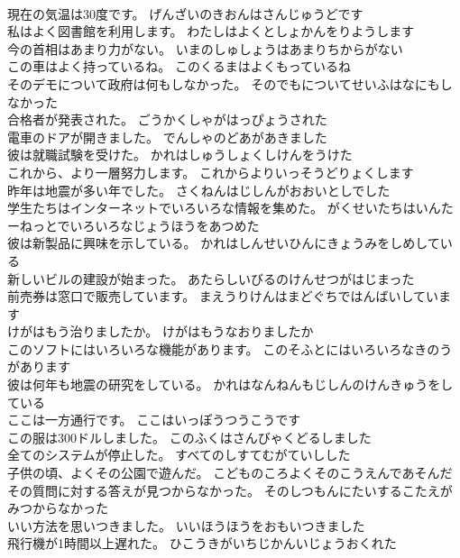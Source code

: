 \documentclass[8pt]{extreport}
\begin{document}
\begin{CJK}{UTF8}{min}
\\	現在の気温は30度です。	げんざいのきおんはさんじゅうどです 
\\	私はよく図書館を利用します。	わたしはよくとしょかんをりようします 
\\	今の首相はあまり力がない。	いまのしゅしょうはあまりちからがない 
\\	この車はよく持っているね。	このくるまはよくもっているね 
\\	そのデモについて政府は何もしなかった。	そのでもについてせいふはなにもしなかった 
\\	合格者が発表された。	ごうかくしゃがはっぴょうされた 
\\	電車のドアが開きました。	でんしゃのどあがあきました 
\\	彼は就職試験を受けた。	かれはしゅうしょくしけんをうけた 
\\	これから、より一層努力します。	これからよりいっそうどりょくします 
\\	昨年は地震が多い年でした。	さくねんはじしんがおおいとしでした 
\\	学生たちはインターネットでいろいろな情報を集めた。	がくせいたちはいんたーねっとでいろいろなじょうほうをあつめた 
\\	彼は新製品に興味を示している。	かれはしんせいひんにきょうみをしめしている 
\\	新しいビルの建設が始まった。	あたらしいびるのけんせつがはじまった 
\\	前売券は窓口で販売しています。	まえうりけんはまどぐちではんばいしています 
\\	けがはもう治りましたか。	けがはもうなおりましたか 
\\	このソフトにはいろいろな機能があります。	このそふとにはいろいろなきのうがあります 
\\	彼は何年も地震の研究をしている。	かれはなんねんもじしんのけんきゅうをしている 
\\	ここは一方通行です。	ここはいっぽうつうこうです 
\\	この服は300ドルしました。	このふくはさんびゃくどるしました 
\\	全てのシステムが停止した。	すべてのしすてむがていしした 
\\	子供の頃、よくその公園で遊んだ。	こどものころよくそのこうえんであそんだ 
\\	その質問に対する答えが見つからなかった。	そのしつもんにたいするこたえがみつからなかった 
\\	いい方法を思いつきました。	いいほうほうをおもいつきました 
\\	飛行機が1時間以上遅れた。	ひこうきがいちじかんいじょうおくれた 

\end{CJK}
\end{document}
